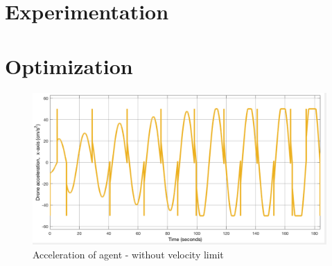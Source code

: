 \section{Experimentation}

\section{Optimization}



\begin{figure}[h!]
  \centering
  \includegraphics[width=.8\columnwidth]{figures/SA_accel_with_no_vel_limit.png}
  \caption{Acceleration of agent - without velocity limit}
  \label{fig:sa_accel_no_vel_adj}
\end{figure}






